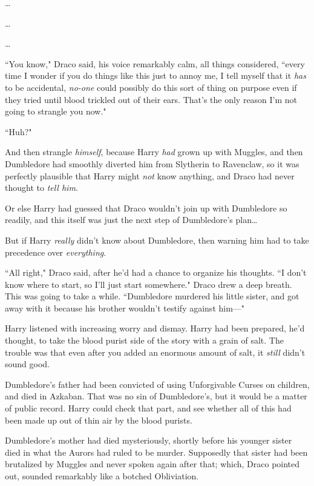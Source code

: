 {\ldots}

{\ldots}

{\ldots}

``You know," Draco said, his voice remarkably calm, all things considered, ``every time I wonder if you do things like this just to annoy me, I tell myself that it \emph{has} to be accidental, \emph{no-one} could possibly do this sort of thing on purpose even if they tried until blood trickled out of their ears. That's the only reason I'm not going to strangle you now."

``Huh?"

And then strangle \emph{himself}, because Harry \emph{had} grown up with Muggles, and then Dumbledore had smoothly diverted him from Slytherin to Ravenclaw, so it was perfectly plausible that Harry might \emph{not} know anything, and Draco had never thought to \emph{tell him}.

Or else Harry had guessed that Draco wouldn't join up with Dumbledore so readily, and this itself was just the next step of Dumbledore's plan{\ldots}

But if Harry \emph{really} didn't know about Dumbledore, then warning him had to take precedence over \emph{everything}.

``All right," Draco said, after he'd had a chance to organize his thoughts. ``I don't know where to start, so I'll just start somewhere." Draco drew a deep breath. This was going to take a while. ``Dumbledore murdered his little sister, and got away with it because his brother wouldn't testify against him—"

\later

Harry listened with increasing worry and dismay. Harry had been prepared, he'd thought, to take the blood purist side of the story with a grain of salt. The trouble was that even after you added an enormous amount of salt, it \emph{still} didn't sound good.

Dumbledore's father had been convicted of using Unforgivable Curses on children, and died in Azkaban. That was no sin of Dumbledore's, but it would be a matter of public record. Harry could check that part, and see whether all of this had been made up out of thin air by the blood purists.

Dumbledore's mother had died mysteriously, shortly before his younger sister died in what the Aurors had ruled to be murder. Supposedly that sister had been brutalized by Muggles and never spoken again after that; which, Draco pointed out, sounded remarkably like a botched Obliviation.

